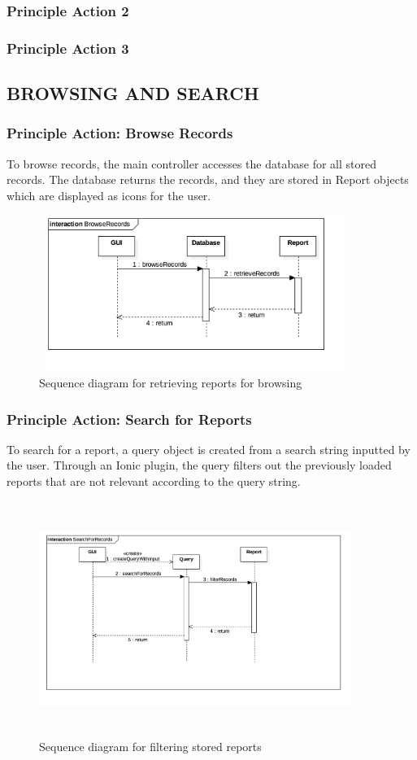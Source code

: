 \documentclass[twoside,letterpaper]{article}
\begin{document}
{\subsubsection{Principle Action 2}
\subsubsection{Principle Action 3}

\subsection[BROWSING AND SEARCH]{\rmfamily\bfseries\color{black}
BROWSING AND SEARCH}
\subsubsection{Principle Action: Browse Records}
To browse records, the main controller accesses the database for all stored records. The database returns the records, and they are stored in Report objects which are displayed as icons for the user.
\begin{figure}[H]
\centering
\includegraphics[width=4in,height=2in]{BrowseRecords.png}
\caption{Sequence diagram for retrieving reports for browsing}
\end{figure}
\subsubsection{Principle Action: Search for Reports}
To search for a report, a query object is created from a search string inputted by the user. Through an Ionic plugin, the query filters out the previously loaded reports that are not relevant according to the query string.
\begin{figure}[H]
\centering
\includegraphics[width=4in,height=3in]{SearchForRecords.png}
\caption{Sequence diagram for filtering stored reports}
\end{figure}
}
\end{document}
